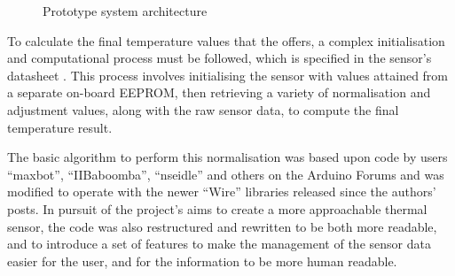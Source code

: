 \documentclass[../thesis/thesis.tex]{subfiles}
\begin{document}
\begin{figure}
\centering
{}
\caption{Prototype system architecture}
\label{fig:pictures:protob-arch}
\end{figure}

To calculate the final temperature values that the \mlx offers, a complex initialisation and computational process must be followed, which is specified in the sensor's datasheet \cite{MLXDatasheet}. This process involves initialising the sensor with values attained from a separate on-board \iic EEPROM, then retrieving a variety of normalisation and adjustment values, along with the raw sensor data, to compute the final temperature result.

The basic algorithm to perform this normalisation was based upon code by users ``maxbot'', ``IIBaboomba'', ``nseidle'' and others on the Arduino Forums \cite{ArduinoForum} and was modified to operate with the newer \ard ``Wire'' \iic libraries released since the authors' posts. In pursuit of the project's aims to create a more approachable thermal sensor, the code was also restructured and rewritten to be both more readable, and to introduce a set of features to make the management of the sensor data easier for the user, and for the information to be more human readable.
\end{document}
